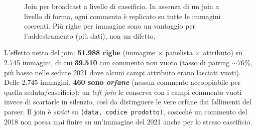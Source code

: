 \documentclass[11pt,a4paper]{article}
\begin{document}
\begin{figure}[t]
\centering
{}
\caption{Join per broadcast a livello di caseificio. In assenza di un join a
livello di forma, ogni commento \`e replicato su tutte le immagini coerenti.
Pi\`u righe per immagine sono un vantaggio per l'addestramento (pi\`u dati),
non un difetto.}
\label{fig:broadcast}
\end{figure}

L'effetto netto del join: \textbf{51.988 righe} (immagine $\times$ panelista
$\times$ attributo) su 2.745 immagini, di cui \textbf{39.510} con commento non
vuoto (tasso di pairing $\sim 76\%$, pi\`u basso nelle sedute 2021 dove alcuni
campi attributo erano lasciati vuoti). Delle 2.745 immagini, \textbf{460 sono
\emph{orfane}} (nessun commento accoppiabile per quella seduta/caseificio): un
\emph{left join} le conserva con i campi commento vuoti invece di scartarle in
silenzio, cos\`i da distinguere le vere orfane dai fallimenti del parser. Il
join \`e \emph{strict} su \texttt{(data, codice prodotto)}, cosicch\'e un
commento del 2018 non possa mai finire su un'immagine del 2021 anche per lo
stesso caseificio.
\end{document}
